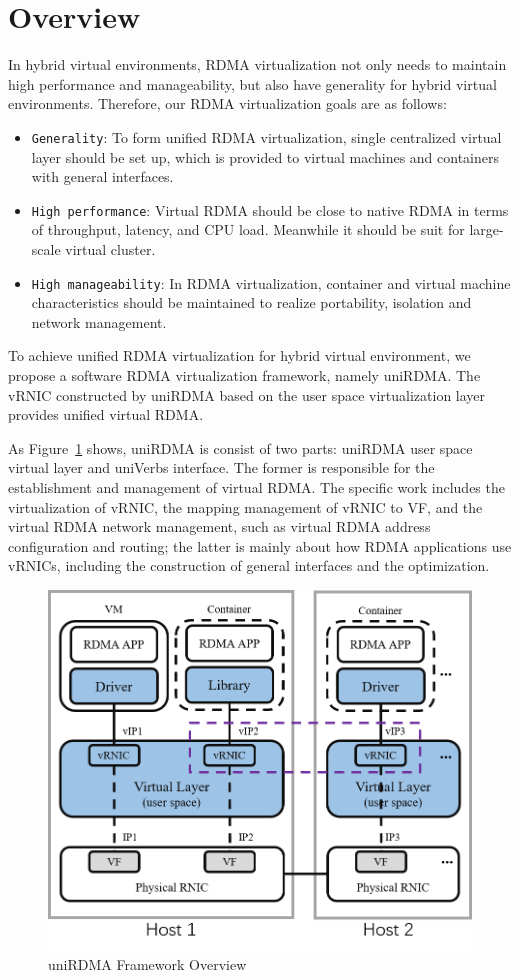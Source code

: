 \section{Overview}

In hybrid virtual environments, RDMA virtualization not only needs to maintain high performance and manageability, but also have generality for hybrid virtual environments. Therefore, our RDMA virtualization goals are as follows:

\begin{itemize}
	\item {\verb|Generality|}: To form unified RDMA virtualization, single centralized virtual layer should be set up, which is provided to virtual machines and containers with general interfaces.
	\item {\verb|High performance|}: Virtual RDMA should be close to native RDMA in terms of throughput, latency, and CPU load. Meanwhile it should be suit for large-scale virtual cluster.
	\item {\verb|High manageability|}: In RDMA virtualization, container and virtual machine characteristics should be maintained to realize portability, isolation and network management.
\end{itemize}

To achieve unified RDMA virtualization for hybrid virtual environment,  we propose a software RDMA virtualization framework, namely uniRDMA. The vRNIC constructed by uniRDMA based on the user space virtualization layer provides unified virtual RDMA.

As Figure~\ref{fig:framework-overview} shows, uniRDMA is consist of two parts: uniRDMA user space virtual layer and uniVerbs interface. The former is responsible for the establishment and management of virtual RDMA. The specific work includes the virtualization of vRNIC, the mapping management of vRNIC to VF, and the virtual RDMA network management, such as virtual RDMA address configuration and routing; the latter is mainly about how RDMA applications use vRNICs, including the construction of general interfaces and the optimization.

\begin{figure}[!ht]
	\centering
	\includegraphics[width=0.9\linewidth]{images/framework-overview.png}
	\caption{uniRDMA Framework Overview}
	\label{fig:framework-overview}
\end{figure}
